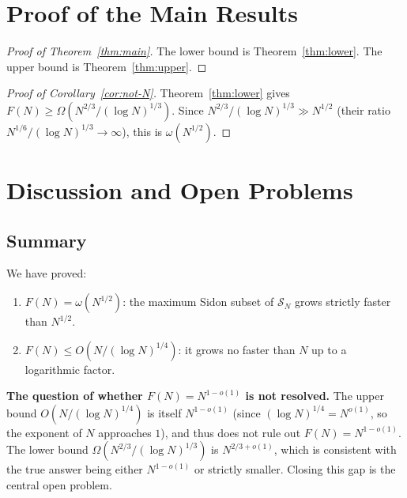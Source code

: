 \documentclass[12pt]{article}
\theoremstyle{definition}
\newcommand{\SN}{\mathcal{S}_N}
\begin{document}
\section{Proof of the Main Results}

\begin{proof}[Proof of Theorem~\ref{thm:main}]
The lower bound is Theorem~\ref{thm:lower}.
The upper bound is Theorem~\ref{thm:upper}.
\end{proof}

\begin{proof}[Proof of Corollary~\ref{cor:not-N}]
Theorem~\ref{thm:lower} gives $F(N) \ge \Omega(N^{2/3}/(\log N)^{1/3})$.
Since $N^{2/3}/(\log N)^{1/3} \gg N^{1/2}$ (their ratio $N^{1/6}/(\log N)^{1/3} \to \infty$),
this is $\omega(N^{1/2})$.
\end{proof}

\section{Discussion and Open Problems}

\subsection{Summary}

We have proved:
\begin{enumerate}
  \item $F(N) = \omega(N^{1/2})$: the maximum Sidon subset of $\SN$
        grows strictly faster than $N^{1/2}$.
  \item $F(N) \le O(N/(\log N)^{1/4})$: it grows no faster than
        $N$ up to a logarithmic factor.
\end{enumerate}

\noindent\textbf{The question of whether $F(N) = N^{1-o(1)}$ is not resolved.}
The upper bound $O(N/(\log N)^{1/4})$ is itself $N^{1-o(1)}$
(since $(\log N)^{1/4} = N^{o(1)}$, so the exponent of $N$ approaches $1$),
and thus does not rule out $F(N) = N^{1-o(1)}$.
The lower bound $\Omega(N^{2/3}/(\log N)^{1/3})$ is $N^{2/3+o(1)}$,
which is consistent with the true answer being either $N^{1-o(1)}$ or
strictly smaller.  Closing this gap is the central open problem.
\end{document}
